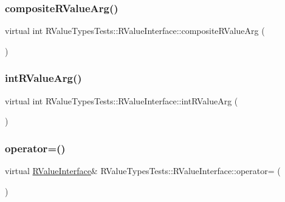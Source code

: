 \subsubsection{\texorpdfstring{compositeRValueArg()}{compositeRValueArg()}}
{\footnotesize\ttfamily virtual int R\+Value\+Types\+Tests\+::\+R\+Value\+Interface\+::composite\+R\+Value\+Arg (\begin{DoxyParamCaption}\item[{\mbox{\hyperlink{structRValueTypesTests_ae0674508758cee5fa643063720d87a20}{Composite\+Type}} \&\&}]{ }\end{DoxyParamCaption})\hspace{0.3cm}{\ttfamily [pure virtual]}}

\mbox{\label{structRValueTypesTests_1_1RValueInterface_ad3ff6c3ad1345af273452f15b45ce3cb}} 
\subsubsection{\texorpdfstring{intRValueArg()}{intRValueArg()}}
{\footnotesize\ttfamily virtual int R\+Value\+Types\+Tests\+::\+R\+Value\+Interface\+::int\+R\+Value\+Arg (\begin{DoxyParamCaption}\item[{int \&\&}]{ }\end{DoxyParamCaption})\hspace{0.3cm}{\ttfamily [pure virtual]}}

\mbox{\label{structRValueTypesTests_1_1RValueInterface_a3d6e9a5362141e9d2dedfb4d6a6e6bbb}} 
\subsubsection{\texorpdfstring{operator=()}{operator=()}\hspace{0.1cm}{\footnotesize\ttfamily [1/2]}}
{\footnotesize\ttfamily virtual \mbox{\hyperlink{structRValueTypesTests_1_1RValueInterface}{R\+Value\+Interface}}\& R\+Value\+Types\+Tests\+::\+R\+Value\+Interface\+::operator= (\begin{DoxyParamCaption}\item[{\mbox{\hyperlink{structRValueTypesTests_1_1RValueInterface}{R\+Value\+Interface}} \&\&}]{ }\end{DoxyParamCaption})\hspace{0.3cm}{\ttfamily [pure virtual]}}

